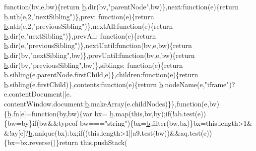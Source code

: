 \begin{DoxyCode}
{      function}(bv,e,bw)\{\textcolor{keywordflow}{return} \hyperlink{a00039_aa4026ad5544b958e54ce5e106fa1c805}{b}.dir(bv,\textcolor{stringliteral}{"parentNode"},bw)\},next:\textcolor{keyword}{function}(e)\{\textcolor{keywordflow}{return} \hyperlink{a00039_aa4026ad5544b958e54ce5e106fa1c805}{b}.nth(e,2,\textcolor{stringliteral}{"nextSibling"})\},prev:\textcolor{keyword}{
      function}(e)\{\textcolor{keywordflow}{return} \hyperlink{a00039_aa4026ad5544b958e54ce5e106fa1c805}{b}.nth(e,2,\textcolor{stringliteral}{"previousSibling"})\},nextAll:\textcolor{keyword}{function}(e)\{\textcolor{keywordflow}{return} \hyperlink{a00039_aa4026ad5544b958e54ce5e106fa1c805}{b}.dir(e,\textcolor{stringliteral}{"nextSibling"})\},prevAll:\textcolor{keyword}{
      function}(e)\{\textcolor{keywordflow}{return} \hyperlink{a00039_aa4026ad5544b958e54ce5e106fa1c805}{b}.dir(e,\textcolor{stringliteral}{"previousSibling"})\},nextUntil:\textcolor{keyword}{function}(bv,e,bw)\{\textcolor{keywordflow}{return} 
      \hyperlink{a00039_aa4026ad5544b958e54ce5e106fa1c805}{b}.dir(bv,\textcolor{stringliteral}{"nextSibling"},bw)\},prevUntil:\textcolor{keyword}{function}(bv,e,bw)\{\textcolor{keywordflow}{return} \hyperlink{a00039_aa4026ad5544b958e54ce5e106fa1c805}{b}.dir(bv,\textcolor{stringliteral}{"previousSibling"},bw)\},siblings:\textcolor{keyword}{
      function}(e)\{\textcolor{keywordflow}{return} \hyperlink{a00039_aa4026ad5544b958e54ce5e106fa1c805}{b}.sibling(e.parentNode.firstChild,e)\},children:\textcolor{keyword}{function}(e)\{\textcolor{keywordflow}{return} 
      \hyperlink{a00039_aa4026ad5544b958e54ce5e106fa1c805}{b}.sibling(e.firstChild)\},contents:\textcolor{keyword}{function}(e)\{\textcolor{keywordflow}{return} \hyperlink{a00039_aa4026ad5544b958e54ce5e106fa1c805}{b}.nodeName(e,\textcolor{stringliteral}{"iframe"})?e.contentDocument||e.
      contentWindow.document:\hyperlink{a00039_aa4026ad5544b958e54ce5e106fa1c805}{b}.makeArray(e.childNodes)\}\},\textcolor{keyword}{function}(e,bv)\{\hyperlink{a00039_aa4026ad5544b958e54ce5e106fa1c805}{b}.fn[e]=\textcolor{keyword}{function}(by,bw)\{var bx=
      \hyperlink{a00039_aa4026ad5544b958e54ce5e106fa1c805}{b}.map(\textcolor{keyword}{this},bv,by);\textcolor{keywordflow}{if}(!ab.test(e))\{bw=by\}\textcolor{keywordflow}{if}(bw&&typeof bw===\textcolor{stringliteral}{"string"})\{bx=\hyperlink{a00039_aa4026ad5544b958e54ce5e106fa1c805}{b}.filter(bw,bx)\}bx=this.length>1&
      &!ay[e]?\hyperlink{a00039_aa4026ad5544b958e54ce5e106fa1c805}{b}.unique(bx):bx;\textcolor{keywordflow}{if}((this.length>1||a9.test(bw))&&aq.test(e))\{bx=bx.reverse()\}\textcolor{keywordflow}{return} this.pushStack(

\end{DoxyCode}
